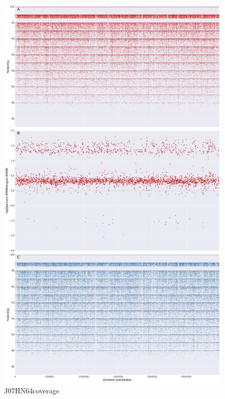 \begin{figure}[!hbtp]
  \centering
  \includegraphics[width=\textwidth,height=\textheight,keepaspectratio]{Chapter5/Figures/coverage_plots/J07HX64_coverage.pdf}
  \caption{J07HN64coverage}
  \label{J07HN64coverage}
\end{figure}

